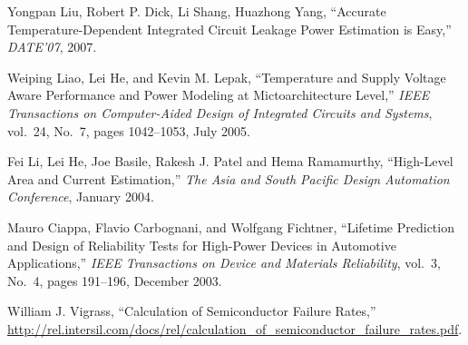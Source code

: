 \begin{thebibliography}{99}
    Yongpan Liu, Robert P. Dick, Li Shang, Huazhong Yang,
    ``Accurate Temperature-Dependent Integrated Circuit Leakage Power Estimation is Easy,''
    \emph{DATE'07},
    2007.

    Weiping Liao, Lei He, and Kevin M. Lepak,
    ``Temperature and Supply Voltage Aware Performance and Power Modeling at Mictoarchitecture Level,''
    \emph{IEEE Transactions on Computer-Aided Design of Integrated Circuits and Systems},
    vol.~24, No.~7, pages 1042--1053, July 2005.

    Fei Li, Lei He, Joe Basile, Rakesh J. Patel and Hema Ramamurthy,
    ``High-Level Area and Current Estimation,''
    \emph{The Asia and South Pacific Design Automation Conference},
    January 2004.

    Mauro Ciappa, Flavio Carbognani, and Wolfgang Fichtner,
    ``Lifetime Prediction and Design of Reliability Tests for High-Power Devices in Automotive Applications,''
    \emph{IEEE Transactions on Device and Materials Reliability},
    vol.~3, No.~4, pages 191--196, December 2003.

    William J. Vigrass,
    ``Calculation of Semiconductor Failure Rates,''
    \url{http://rel.intersil.com/docs/rel/calculation_of_semiconductor_failure_rates.pdf}.
\end{thebibliography}

